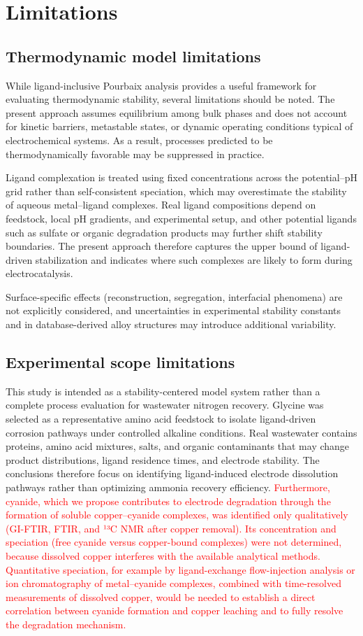 \documentclass[twoside,twocolumn,9pt]{article}
\begin{document}
\section{Limitations}
\subsection{Thermodynamic model limitations}
While ligand-inclusive Pourbaix analysis provides a useful framework for evaluating thermodynamic stability, several limitations should be noted. The present approach assumes equilibrium among bulk phases and does not account for kinetic barriers, metastable states, or dynamic operating conditions typical of electrochemical systems. As a result, processes predicted to be thermodynamically favorable may be suppressed in practice.

Ligand complexation is treated using fixed concentrations across the potential–pH grid rather than self-consistent speciation, which may overestimate the stability of aqueous metal–ligand complexes. Real ligand compositions depend on feedstock, local pH gradients, and experimental setup, and other potential ligands such as sulfate or organic degradation products may further shift stability boundaries. The present approach therefore captures the upper bound of ligand-driven stabilization and indicates where such complexes are likely to form during electrocatalysis.

Surface-specific effects (reconstruction, segregation, interfacial phenomena) are not explicitly considered, and uncertainties in experimental stability constants and in database-derived alloy structures may introduce additional variability. 

\subsection{Experimental scope limitations}
This study is intended as a stability-centered model system rather than a complete process evaluation for wastewater nitrogen recovery. Glycine was selected as a representative amino acid feedstock to isolate ligand-driven corrosion pathways under controlled alkaline conditions. Real wastewater contains proteins, amino acid mixtures, salts, and organic contaminants that may change product distributions, ligand residence times, and electrode stability. The conclusions therefore focus on identifying ligand-induced electrode dissolution pathways rather than optimizing ammonia recovery efficiency. \textcolor{red}{ Furthermore, cyanide, which we propose contributes to electrode degradation through the formation of soluble copper–cyanide complexes, was identified only qualitatively (GI-FTIR, FTIR, and ¹³C NMR after copper removal). Its concentration and speciation (free cyanide versus copper-bound complexes) were not determined, because dissolved copper interferes with the available analytical methods. Quantitative speciation, for example by ligand-exchange flow-injection analysis or ion chromatography of metal–cyanide complexes, combined with time-resolved measurements of dissolved copper, would be needed to establish a direct correlation between cyanide formation and copper leaching and to fully resolve the degradation mechanism.}
\end{document}
